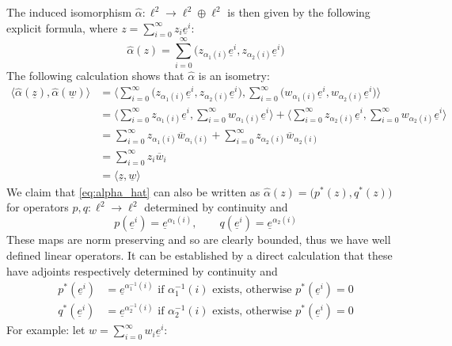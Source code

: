 \documentclass[12pt]{article}
\theoremstyle{plain}
\theoremstyle{definition}
\newcommand{\lto}{\longrightarrow}
\begin{document}
	The induced isomorphism $\hat{\alpha}: \ell^2 \lto \ell^2 \oplus \ell^2$ is then given by the following explicit formula, where $z = \sum_{i = 0}^\infty z_i\underline{e}^i$:
	\begin{equation}\label{eq:alpha_hat}
		\hat{\alpha}(z) = \sum_{i = 0}^\infty\Big( z_{\alpha_1(i)}\underline{e}^i,z_{\alpha_2(i)}\underline{e}^i\Big)
	\end{equation}
	The following calculation shows that $\hat{\alpha}$ is an isometry:
	\begin{align*}
		\big\langle \hat{\alpha}(\underline{z}), \hat{\alpha}(\underline{w})\big\rangle &= \Big\langle \sum_{i = 0}^\infty \big(z_{\alpha_1(i)}\underline{e}^i, z_{\alpha_2(i)}\underline{e}^i\big), \sum_{i = 0}^\infty \big( w_{\alpha_1(i)}\underline{e}^i, w_{\alpha_2(i)}\underline{e}^i\big) \Big\rangle\\
		&= \Big\langle \sum_{i = 0}^\infty z_{\alpha_1(i)}\underline{e}^i, \sum_{i = 0}^\infty w_{\alpha_1(i)}\underline{e}^i\Big\rangle + \Big\langle \sum_{i = 0}^\infty z_{\alpha_2(i)}\underline{e}^i, \sum_{i = 0}^\infty w_{\alpha_2(i)}\underline{e}^i \Big\rangle\\
		&= \sum_{i = 0}^\infty z_{\alpha_1(i)}\overline{w}_{\alpha_i(i)} + \sum_{i = 0}^\infty z_{\alpha_2(i)}\overline{w}_{\alpha_2(i)}\\
		&= \sum_{i = 0}^\infty z_i\overline{w}_i\\
		&=  \langle \underline{z},\underline{w}\rangle
	\end{align*}
	We claim that \eqref{eq:alpha_hat} can also be written as $\hat{\alpha}(z) = \big(p^\ast(z), q^\ast(z)\big)$ for operators $p,q: \ell^2 \lto \ell^2$ determined by continuity and
	\begin{equation}
		p(\underline{e}^i) = \underline{e}^{\alpha_1(i)},\qquad q(\underline{e}^i) = \underline{e}^{\alpha_2(i)}
	\end{equation}
	These maps are norm preserving and so are clearly bounded, thus we have well defined linear operators. It can be established by a direct calculation that these have adjoints respectively determined by continuity and
	\begin{align}
		p^\ast(\underline{e}^i) &= \underline{e}^{\alpha_1^{-1}(i)}\text{ if }\alpha_1^{-1}(i)\text{ exists, otherwise }p^\ast(\underline{e}^i) = 0\\
		q^\ast(\underline{e}^i) &= \underline{e}^{\alpha_2^{-1}(i)}\text{ if }\alpha_2^{-1}(i)\text{ exists, otherwise }p^\ast(\underline{e}^i) = 0
	\end{align}
	For example: let $w = \sum_{i = 0}^\infty w_i\underline{e}^i$:
\end{document}
